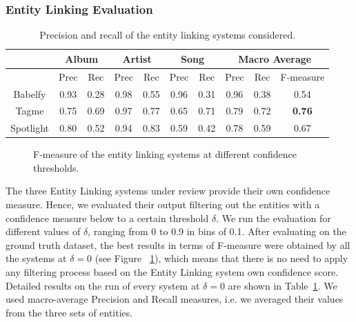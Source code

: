 \subsubsection{Entity Linking Evaluation}

\begin{table}[]
\scriptsize
\centering
	\begin{tabular}{ c c c c c c c c c c }
	\hline
& \multicolumn{2}{c}{Album} & \multicolumn{2}{c}{Artist} & \multicolumn{2}{c}{Song} & \multicolumn{3}{c}{Macro Average}  \\
\hline
	& Prec & Rec & Prec & Rec & Prec & Rec & Prec & Rec & F-measure \\
	\hline
Babelfy & 0.93 & 0.28 & 0.98 & 0.55 & 0.96 & 0.31 & 0.96 & 0.38 & 0.54 \\
Tagme & 0.75 & 0.69 & 0.97 & 0.77 & 0.65 & 0.71 & 0.79 & 0.72 & \textbf{0.76} \\
Spotlight & 0.80 & 0.52 & 0.94 & 0.83 & 0.59 & 0.42 & 0.78 & 0.59 & 0.67 \\
\hline
	\end{tabular}
	\caption{Precision and recall of the entity linking systems considered.}
	\label{tbl:kb:res_categories}
\end{table}

\begin{figure}[!htp]
\centerline{}
\caption[F-measure of the entity linking systems at different thresholds.]{F-measure of the entity linking systems at different confidence thresholds.}
\label{fig:kb:confidence_el}
\end{figure}

The three Entity Linking systems under review provide their own confidence measure. Hence, we evaluated their output filtering out the entities with a confidence measure below to a certain threshold $\delta$. We run the evaluation for different values of $\delta$, ranging from 0 to 0.9 in bins of 0.1. After evaluating on the ground truth dataset, the best results in terms of F-measure were obtained by all the systems at $\delta = 0$ (see Figure ~\ref{fig:kb:confidence_el}), which means that there is no need to apply any filtering process based on the Entity Linking system own confidence score. Detailed results on the run of every system at $\delta = 0$ are shown in Table~\ref{tbl:kb:res_categories}. We used macro-average Precision and Recall measures, i.e. we averaged their values from the three sets of entities.

